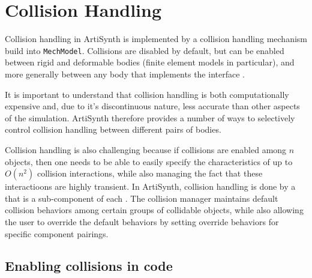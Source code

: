 


\section{Collision Handling}
\label{sec:mechii:collisions}

Collision handling in ArtiSynth is implemented by a collision
handling mechanism build into {\tt MechModel}. Collisions are
disabled by default, but can be enabled between rigid and deformable
bodies (finite element models in particular), and more generally
between any body that implements the interface 
.

It is important to understand that collision handling is both
computationally expensive and, due to it's discontinuous nature, less
accurate than other aspects of the simulation.  ArtiSynth therefore
provides a number of ways to selectively control collision handling
between different pairs of bodies.

Collision handling is also challenging because if collisions are
enabled among $n$ objects, then one needs to be able to easily specify
the characteristics of up to $O(n^2)$ collision interactions, while
also managing the fact that these interactioons are highly transient.
In ArtiSynth, collision handling is done by a
 that is a
sub-component of each
.  The collision
manager maintains default collision behaviors among certain groups of
collidable objects, while also allowing the user to override the
default behaviors by setting override behaviors for specific component
pairings.


\subsection{Enabling collisions in code}

